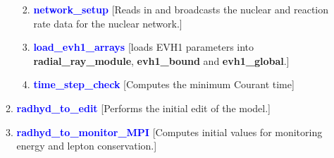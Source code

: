 \documentclass[11pt,doublespace]{article}
\begin{document}
\begin{itemize}
\begin{enumerate}
\begin{enumerate}
\begin{enumerate}
{\begin{enumerate}
\end{enumerate}

  }

\end{enumerate}

  \item \textcolor{blue}{ {\bf network\_setup} }
  [Reads in and broadcasts the nuclear and reaction rate data for the nuclear network.]
  
  \item \textcolor{blue}{ {\bf load\_evh1\_arrays} }
  [loads EVH1 parameters into {\bf radial\_ray\_module}, {\bf evh1\_bound} and {\bf evh1\_global}.]
  
  \item \textcolor{blue}{ {\bf time\_step\_check} }
  [Computes the minimum Courant time]\\

\end{enumerate}

  \item \textcolor{blue}{ {\bf radhyd\_to\_edit} }
  [Performs the initial edit of the model.] 

  \item \textcolor{blue}{ {\bf radhyd\_to\_monitor\_MPI} }
  [Computes initial values for monitoring energy and lepton conservation.] 

\end{enumerate}

\end{itemize}
\end{document}
